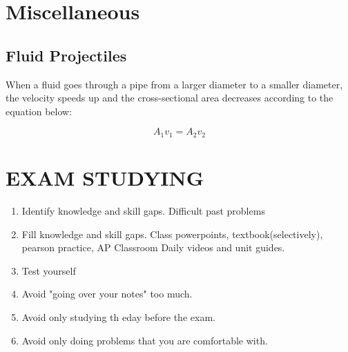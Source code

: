 \documentclass{report}
\begin{document}



\chapter{Miscellaneous}


\section{Fluid Projectiles}

When a fluid goes through a pipe from a larger diameter to a smaller diameter, the velocity speeds up and the cross-sectional area decreases according to the equation below: 

$$ A_1v_1 = A_2v_2 $$

\chapter{EXAM STUDYING}

\begin{enumerate}
  \item Identify knowledge and skill gaps. Difficult past problems
  \item Fill knowledge and skill gaps. Class powerpoints, textbook(selectively), pearson practice, AP Classroom Daily videos and unit guides. 
  \item Test yourself
  \item Avoid "going over your notes" too much. 
  \item Avoid only studying th eday before the exam. 
  \item Avoid only doing problems that you are comfortable with.
\end{enumerate}
\end{document}
